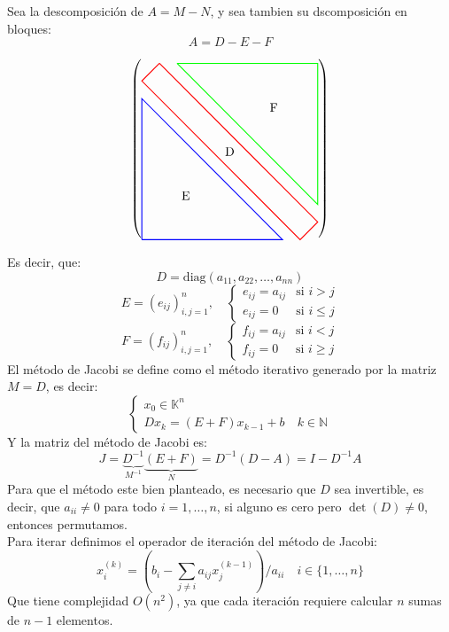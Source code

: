 \begin{teorema}
    Sea la descomposición de $A=M-N$, y sea tambien su dscomposición en bloques:
    \[
        A = D - E - F
    \]
    \begin{center}
    \[
        \left(
        \begin{tikzpicture}[baseline=(current bounding box.center)]
            \draw[thick, green] (-1.5, 2.5) -- (2.5,2.5) -- (2.5,-1.5) -- (-1.5,2.5);
            \draw[thick, blue] (-2.5,-2.5) -- (-2.5,1.5) -- (1.5,-2.5) -- (-2.5,-2.5);
            \draw[thick, red] (-2, 2.5) -- (2.5, -2) -- (2, -2.5) -- (-2.5, 2) -- (-2, 2.5);
            \node at (0, 0) {D};
            \node at (-1.25, -1.25) {E};
            \node at (1.25, 1.25) {F};
        \end{tikzpicture}
        \right)
    \]
    \end{center}
    Es decir, que:
    \[
        D = \text{diag}(a_{11}, a_{22}, \dots, a_{nn})
    \]
    \[
        E = (e_{ij})_{i,j=1}^n, \quad \begin{cases}
            e_{ij} = a_{ij} & \text{si } i > j \\
            e_{ij} = 0 & \text{si } i \leq j
        \end{cases}
    \]
    \[
        F = (f_{ij})_{i,j=1}^n, \quad \begin{cases}
            f_{ij} = a_{ij} & \text{si } i < j \\
            f_{ij} = 0 & \text{si } i \geq j
        \end{cases}
    \]
    El método de Jacobi se define como el método iterativo generado por la matriz $M = D$, es decir:
    \[
    \begin{cases}
        x_0 \in \mathbb{K}^n \\
        Dx_k = (E + F)x_{k-1} + b \quad k \in \mathbb{N}
    \end{cases}
    \]
    Y la matriz del método de Jacobi es:
    \[
        J = \underbrace{D^{-1}}_{M^{-1}} \underbrace{(E+F)}_{N} = D^{-1}(D - A) = I - D^{-1}A
    \]
    Para que el método este bien planteado, es necesario que $D$ sea invertible, es decir, que $a_{ii} \neq 0$ para todo $i = 1, \dots, n$, si alguno es cero pero $\det(D) \neq 0$, entonces permutamos.\\
    Para iterar definimos el operador de iteración del método de Jacobi:
    \[
        x_i^{(k)} =
        \left(b_i - \sum_{j \neq i} a_{ij} x_j^{(k-1)}\right) / a_{ii}  
        \quad i \in \{1, \dots, n\}
    \]
    Que tiene complejidad $O(n^2)$, ya que cada iteración requiere calcular $n$ sumas de $n-1$ elementos.\\
\end{teorema}

